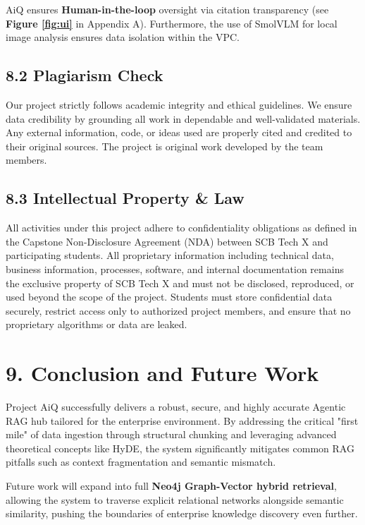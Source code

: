 \documentclass[12pt]{article}
\begin{document}
AiQ ensures \textbf{Human-in-the-loop} oversight via citation transparency (see \textbf{Figure \ref{fig:ui}} in Appendix A). Furthermore, the use of SmolVLM for local image analysis ensures data isolation within the VPC.

\subsection{8.2 Plagiarism Check}
Our project strictly follows academic integrity and ethical guidelines. We ensure data credibility by grounding all work in dependable and well-validated materials. Any external information, code, or ideas used are properly cited and credited to their original sources. The project is original work developed by the team members.

\subsection{8.3 Intellectual Property \& Law}
All activities under this project adhere to confidentiality obligations as defined in the Capstone Non-Disclosure Agreement (NDA) between SCB Tech X and participating students. All proprietary information including technical data, business information, processes, software, and internal documentation remains the exclusive property of SCB Tech X and must not be disclosed, reproduced, or used beyond the scope of the project. Students must store confidential data securely, restrict access only to authorized project members, and ensure that no proprietary algorithms or data are leaked.

\newpage
\section{9. Conclusion and Future Work}
Project AiQ successfully delivers a robust, secure, and highly accurate Agentic RAG hub tailored for the enterprise environment. By addressing the critical "first mile" of data ingestion through structural chunking and leveraging advanced theoretical concepts like HyDE, the system significantly mitigates common RAG pitfalls such as context fragmentation and semantic mismatch.

Future work will expand into full \textbf{Neo4j Graph-Vector hybrid retrieval}, allowing the system to traverse explicit relational networks alongside semantic similarity, pushing the boundaries of enterprise knowledge discovery even further.
\end{document}
